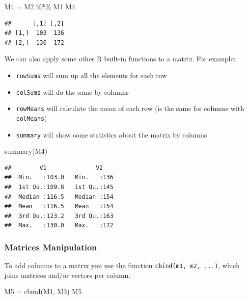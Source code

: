 \documentclass[
]{book}
\newenvironment{Shaded}{\begin{snugshade}}{\end{snugshade}}
\newcommand{\FunctionTok}[1]{\textcolor[rgb]{0.00,0.00,0.00}{#1}}
\newcommand{\NormalTok}[1]{#1}
\newcommand{\OtherTok}[1]{\textcolor[rgb]{0.56,0.35,0.01}{#1}}
\newcommand{\SpecialCharTok}[1]{\textcolor[rgb]{0.00,0.00,0.00}{#1}}
\providecommand{\tightlist}{%
  \setlength{\itemsep}{0pt}\setlength{\parskip}{0pt}}
\begin{document}
\begin{Shaded}
\begin{Highlighting}[]
\NormalTok{M4 }\OtherTok{=}\NormalTok{ M2 }\SpecialCharTok{\%*\%}\NormalTok{ M1}
\NormalTok{M4}
\end{Highlighting}
\end{Shaded}

\begin{verbatim}
##      [,1] [,2]
## [1,]  103  136
## [2,]  130  172
\end{verbatim}

We can also apply some other R built-in functions to a matrix. For example:

\begin{itemize}
\tightlist
\item
  \texttt{rowSums} will sum up all the elements for each row
\item
  \texttt{colSums} will do the same by columns
\item
  \texttt{rowMeans} will calculate the mean of each row (is the same for columns with \texttt{colMeans})
\item
  \texttt{summary} will show some statistics about the matrix by columns
\end{itemize}

\begin{Shaded}
\begin{Highlighting}[]
\FunctionTok{summary}\NormalTok{(M4)}
\end{Highlighting}
\end{Shaded}

\begin{verbatim}
##        V1              V2     
##  Min.   :103.0   Min.   :136  
##  1st Qu.:109.8   1st Qu.:145  
##  Median :116.5   Median :154  
##  Mean   :116.5   Mean   :154  
##  3rd Qu.:123.2   3rd Qu.:163  
##  Max.   :130.0   Max.   :172
\end{verbatim}

\hypertarget{matrices-manipulation}{%
\subsubsection{Matrices Manipulation}\label{matrices-manipulation}}

To add columns to a matrix you use the function \texttt{cbind(m1,\ m2,\ ...)}, which joins matrices and/or vectors per column.

\begin{Shaded}
\begin{Highlighting}[]
\NormalTok{M5 }\OtherTok{=} \FunctionTok{cbind}\NormalTok{(M1, M3)}
\NormalTok{M5}
\end{Highlighting}
\end{Shaded}
\end{document}
